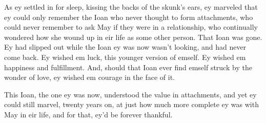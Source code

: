 As ey settled in for sleep, kissing the backs of the skunk's ears, ey marveled that ey could only remember the Ioan who never thought to form attachments, who could never remember to ask May if they were in a relationship, who continually wondered how she wound up in eir life as some other person. That Ioan was gone. Ey had slipped out while the Ioan ey was now wasn't looking, and had never come back. Ey wished em luck, this younger version of emself. Ey wished em happiness and fulfillment. And, should that Ioan ever find emself struck by the wonder of love, ey wished em courage in the face of it.

This Ioan, the one ey was now, understood the value in attachments, and yet ey could still marvel, twenty years on, at just how much more complete ey was with May in eir life, and for that, ey'd be forever thankful.
